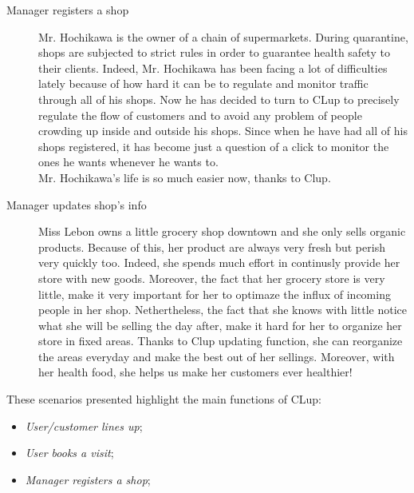 \begin{description}
    \item[Manager registers a shop]
    Mr. Hochikawa is the owner of a chain of supermarkets.
    During quarantine, shops are subjected to strict rules in order to guarantee health safety to their clients. Indeed, Mr. Hochikawa has been facing a lot of difficulties lately because of how hard it can be to regulate and monitor traffic through all of his shops. Now he has decided to turn to CLup to precisely regulate the flow of customers and to avoid any problem of people crowding up inside and outside his shops. Since when he have had all of his shops registered, it has become just a question of a click to monitor the ones he wants whenever he wants to.\\ Mr. Hochikawa’s life is so much easier now, thanks to Clup.


    \item[Manager updates shop's info]
    Miss Lebon owns a little grocery shop downtown and she only sells organic products. Because of this, her product are always very fresh but perish very quickly too. Indeed, she spends much effort in continusly provide her store with new goods. Moreover, the fact that her grocery store is very little, make it very important for her to optimaze the influx of incoming people in her shop. Nethertheless, the fact that she knows with little notice what she will be selling the day after, make it hard for her to organize her store in fixed areas. Thanks to Clup updating function, she can reorganize the areas everyday and make the best out of her sellings. Moreover, with her health food, she helps us make her customers ever healthier!
\end{description}

These scenarios presented highlight the main functions of CLup:
\begin{itemize}[topsep=0pt]
    \item \textit{User/customer lines up};
    \item \textit{User books a visit};
    \item \textit{Manager registers a shop};
\end{itemize}

